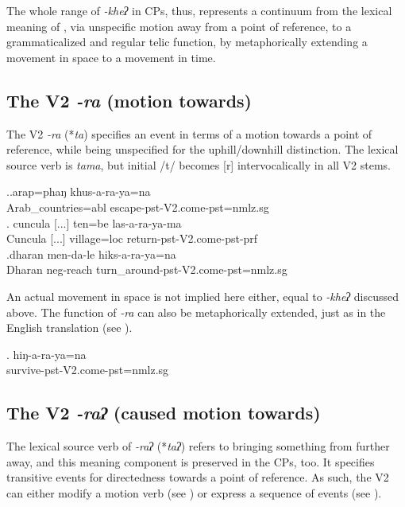 The whole range of   \emph{-kheʔ}  in CPs, thus, represents a con\-tinuum from the lexical meaning of ,  via unspecific motion away from a point of reference, to a grammaticalized and regular telic function, by metaphorically extending a movement in space to a movement in time.
	
\subsection{The V2 \emph{-ra} (motion towards)}\label{V2-comeneut} %

The V2 \emph{-ra} (*\emph{ta})  specifies an event in terms of  a motion towards a point of reference, while being  unspecified for the uphill/downhill distinction. The lexical source verb is \emph{tama}, but  initial /t/ becomes [r] intervocalically in all V2 stems.

\ex.\ag.arap=phaŋ khus-a-ra-ya=na\\
Arab\_countries{\sc =abl} escape{\sc [3sg]-pst-V2.come-pst=nmlz.sg}\\
\bg. cuncula [...] ten=be las-a-ra-ya-ma\\
Cuncula [...] village{\sc =loc} return{\sc [3sg]-pst-V2.come-pst-prf}\\
 
\bg.dharan men-da-le hiks-a-ra-ya=na\\
Dharan {\sc neg-}reach turn\_around{\sc [3sg]-pst-V2.come-pst=nmlz.sg}\\

An actual movement in space is not implied here either, equal to \emph{-kheʔ} discussed above. The function of \emph{-ra} can also be metaphorically extended, just as in the English translation (see \Next).

\exg. hiŋ-a-ra-ya=na\\
survive{\sc [3sg]-pst-V2.come-pst=nmlz.sg}\\


\subsection{The V2 \emph{-raʔ}  (caused motion towards)}\label{V2-bringneut}%

The lexical source verb of  \emph{-raʔ} (*\emph{taʔ})   refers to bringing something from further away, and this meaning component is preserved in the CPs, too. It specifies transitive events for directedness towards a point of reference. As such, the V2 can either modify a motion verb (see \Next[a]) or express a sequence of events (see \Next[b]).

